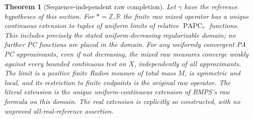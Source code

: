 \documentclass[11pt]{article}
\newtheorem{theorem}{Theorem}
\newcommand{\R}{\mathbb R}
\newcommand{\Z}{\mathbb Z}
\newcommand{\PAPC}{\operatorname{PAPC}}
\begin{document}
\begin{theorem}[Sequence-independent raw completion]\label{raw-extension}
Let $\gamma$ have the reference hypotheses of this section.
For $*=\Z,\R$ the finite raw mixed operator has a unique continuous
extension to tuples of uniform limits of relative $\PAPC_*$ functions.
This includes precisely the stated uniform-decreasing regularizable
domain; no further PC functions are placed in the domain.
For any uniformly convergent PA PC approximants, even if not decreasing,
the mixed raw measures converge weakly against every bounded continuous
test on $X$, independently of all approximants. The limit is a positive
finite Radon measure of total mass $M$, is symmetric and local, and its
restriction to finite endpoints is the original raw operator.
The literal extension is the unique uniform-continuous extension of
BMPS's raw formula on this domain. The real extension is explicitly
so constructed, with no unproved all-real-reference assertion.
\end{theorem}
\end{document}

